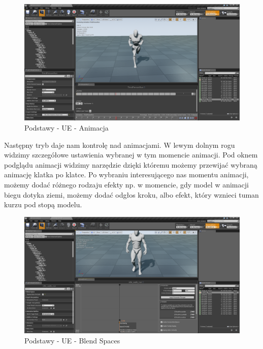\documentclass[openright]{xmgr}
\begin{document}
\newpage
\begin{figure}[!htb]
    \begin{center}
    \includegraphics[scale=0.25]{Screeny/Animation}
    \end{center}
    \caption{Podstawy - UE - Animacja}
\end{figure}

Następny tryb daje nam kontrolę nad animacjami. W lewym dolnym rogu widzimy szczegółowe ustawienia wybranej w tym momencie animacji.
Pod oknem podglądu animacji widzimy narzędzie dzięki któremu możemy przewijać wybraną animację klatka po klatce. Po wybraniu interesującego nas momentu animacji, możemy dodać różnego rodzaju efekty np. w momencie, gdy model w animacji biegu dotyka ziemi, możemy dodać odgłos kroku, albo efekt, który wznieci tuman kurzu pod stopą modelu.

\newpage
\begin{figure}[!htb]
    \begin{center}
    \includegraphics[scale=0.25]{Screeny/Blend_Space}
    \end{center}
    \caption{Podstawy - UE - Blend Spaces}
\end{figure}
\end{document}
